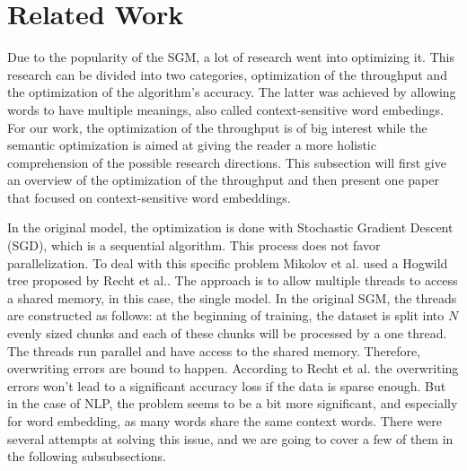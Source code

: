 
\section{Related Work}
Due to the popularity of the SGM, a lot of research went into optimizing it. This research can be divided into two categories, optimization of the throughput and the optimization of the algorithm's accuracy. The latter was achieved by allowing words to have multiple meanings, also called context-sensitive word embedings. For our work, the optimization of the throughput is of big interest while the semantic optimization is aimed at giving the reader a more holistic comprehension of the possible research directions.
This subsection will first give an overview of the optimization of the throughput and then present one paper that focused on context-sensitive word embeddings.


In the original model, the optimization is done with Stochastic Gradient Descent (SGD), which is a sequential algorithm. This process does not favor parallelization. To deal with this specific problem Mikolov et al.\cite{mikolov2} used a Hogwild tree proposed by Recht et al.\cite{hogwild}. The approach is to allow multiple threads to access a shared memory, in this case, the single model. In the original SGM, the threads are constructed as follows: at the beginning of training, the dataset is split into $N$ evenly sized chunks and each of these chunks will be processed by a one thread. The threads run parallel and have access to the shared memory. Therefore, overwriting errors are bound to happen. According to Recht et al.\cite{hogwild} the overwriting errors won't lead to a significant accuracy loss if the data is sparse enough. But in the case of NLP, the problem seems to be a bit more significant, and especially for word embedding, as many words share the same context words. There were several attempts at solving this issue, and we are going to cover a few of them in the following subsubsections.

